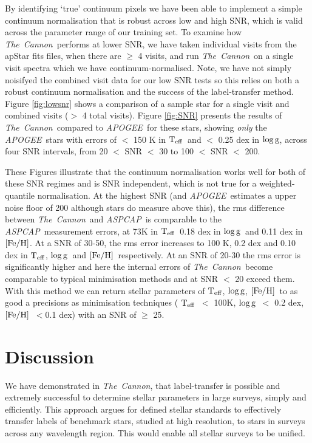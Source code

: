 \documentclass[12pt, preprint]{aastex}
\newcommand{\teff}{\mbox{$\rm T_{eff}$}}
\newcommand{\feh}{\mbox{$\rm [Fe/H]$}}
\newcommand{\logg}{\mbox{$\rm \log g$}}
\newcommand{\tc}{\textsl{The~Cannon}}
\newcommand{\apogee}{\textsl{APOGEE}}
\newcommand{\aspcap}{\textsl{ASPCAP}}
\begin{document}
 


By identifying `true' continuum pixels we have been able to implement a simple continuum normalisation that is robust across low and high SNR, which is valid across the parameter range of our training set. To examine how \tc\ performs at lower SNR, we have taken individual visits from the apStar fits files, when there are $\ge$ 4 visits, and run \tc\ on a single visit spectra which we have continuum-normalised. Note, we have not simply noisifyed the combined visit data for our low SNR tests so this relies on both a robust continuum normalisation and the success of the label-transfer method. Figure \ref{fig:lowsnr} shows a comparison of a sample star for a single visit and combined visits ($>$ 4 total visits). Figure \ref{fig:SNR} presents the results of \tc\ compared to \apogee\ for these stars, showing \textit{only} the \apogee\ stars with errors of $<$ 150 K in \teff\ and $<$ 0.25 dex in \logg, across four SNR intervals, from 20 $<$ SNR $<$ 30 to 100 $<$ SNR $<$ 200. 



These Figures illustrate that the continuum normalisation works well for both of these SNR regimes and is SNR independent, which is not true for a weighted-quantile normalisation. At the highest SNR (and \apogee\ estimates a upper noise floor of 200 although stars do measure above this), the rms difference between \tc\ and \aspcap\ is comparable to the \aspcap\ measurement errors, at 73K in \teff\, 0.18 dex in \logg\ and 0.11 dex in \feh.  At a SNR of 30-50, the rms error increases to 100 K, 0.2 dex and 0.10 dex in \teff, \logg\ and \feh\, respectively. At an SNR of 20-30 the rms error is significantly higher and here the internal errors of \tc\ become comparable to typical minimisation methods and at SNR $<$ 20 exceed them. With this method we can return stellar parameters of \teff, \logg, \feh\ to as good a precisions as minimisation techniques ( \teff\ $<$ 100K, \logg\ $<$ 0.2 dex, \feh\ $< $0.1 dex) with an SNR of $\ge$ 25. 
 



\section{Discussion}

We have demonstrated in \tc,  that label-transfer is possible and extremely successful to determine stellar parameters in large surveys, simply and efficiently. This approach argues for defined stellar standards to effectively transfer labels of benchmark stars, studied at high resolution, to stars in surveys across any wavelength region. This would enable all stellar surveys to be unified. 
\end{document}
